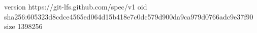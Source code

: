version https://git-lfs.github.com/spec/v1
oid sha256:605323d8cdce4565ed064d15b418e7c0dc579d900da9ca979d0766adc9e37f90
size 1398256
